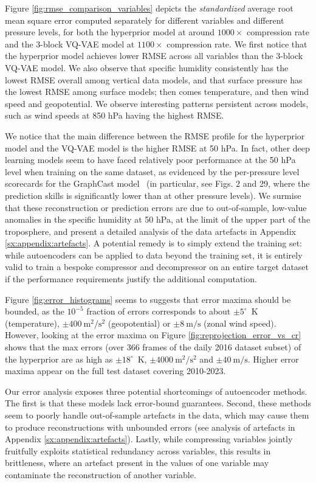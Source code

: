 \documentclass[11pt, a4paper, logo, copyright, numbering]{googledeepmind}
\begin{document}
Figure \ref{fig:rmse_comparison_variables} depicts the \emph{standardized} average root mean square error computed separately for different variables and different pressure levels, for both the hyperprior model at around $1000\times$ compression rate and the 3-block VQ-VAE model at $1100\times$ compression rate. We first notice that the hyperprior model achieves lower RMSE across all variables than the 3-block VQ-VAE model. We also observe that specific humidity consistently has the lowest RMSE overall among vertical data models, and that surface pressure has the lowest RMSE among surface models; then comes temperature, and then wind speed and geopotential. We observe interesting patterns persistent across models, such as wind speeds at 850 hPa having the highest RMSE.

We notice that the main difference between the RMSE profile for the hyperprior model and the VQ-VAE model is the higher RMSE at 50 hPa. In fact, other deep learning models seem to have faced relatively poor performance at the 50 hPa level when training on the same dataset, as evidenced by the per-pressure level scorecards for the GraphCast model~\citep{lam2023graphcast} (in particular, see Figs. 2 and 29, where the prediction skills is significantly lower than at other pressure levels). We surmise that these reconstruction or prediction errors are due to out-of-sample, low-value anomalies in the specific humidity at 50 hPa, at the limit of the upper part of the troposphere, and present a detailed analysis of the data artefacts in Appendix \ref{sx:appendix:artefacts}.
A potential remedy is to simply extend the training set: while autoencoders can be applied to data beyond the training set, it is entirely valid to train a bespoke compressor and decompressor on an entire target dataset if the performance requirements justify the additional computation.

Figure \ref{fig:error_histograms} seems to suggests that error maxima should be bounded, as the $10^{-5}$ fraction of errors 
corresponds to about $\pm 5^\circ$~K (temperature), $\pm 400~\text{m}^2/\text{s}^2$ (geopotential) or $\pm 8~\text{m}/\text{s}$ (zonal wind speed). However, looking at the error maxima on Figure \ref{fig:reprojection_error_vs_cr} shows that the max errors (over 366 frames of the daily 2016 dataset subset) of the hyperprior are as high as $\pm 18^\circ$~K, $\pm 4000~\text{m}^2/\text{s}^2$ and $\pm 40~\text{m}/\text{s}$. Higher error maxima appear on the full test dataset covering 2010-2023.

Our error analysis exposes three potential shortcomings of autoencoder methods. The first is that these models lack error-bound guarantees.
Second, these methods seem to poorly handle out-of-sample artefacts in the data, which may cause them to produce reconstructions with unbounded errors (see analysis of artefacts in Appendix \ref{sx:appendix:artefacts}). Lastly, while compressing variables jointly fruitfully exploits statistical redundancy across variables, this results in brittleness, where an artefact present in the values of one variable may contaminate the reconstruction of another variable.
\end{document}

